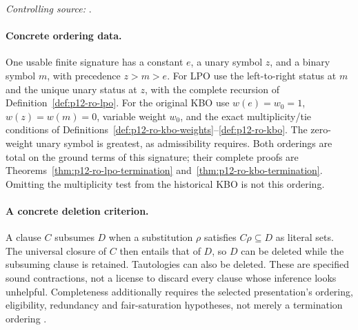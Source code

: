 \noindent\emph{Controlling source:} \cite{BachmairGanzinger2001,NieuwenhuisRubio2001}.

\paragraph{Concrete ordering data.}
One usable finite signature has a constant $e$, a unary symbol $z$, and
a binary symbol $m$, with precedence $z>m>e$.  For LPO use the
left-to-right status at $m$ and the unique unary status at $z$,
with the complete recursion of Definition~\ref{def:p12-ro-lpo}.
For the original KBO use $w(e)=w_0=1$, $w(z)=w(m)=0$, variable
weight $w_0$, and the exact multiplicity/tie conditions of
Definitions~\ref{def:p12-ro-kbo-weights}--\ref{def:p12-ro-kbo}.
The zero-weight unary symbol is greatest, as admissibility requires.
Both orderings are total on the ground terms of this signature; their
complete proofs are Theorems~\ref{thm:p12-ro-lpo-termination}
and~\ref{thm:p12-ro-kbo-termination}.  Omitting the multiplicity test
from the historical KBO is not this ordering.

\paragraph{A concrete deletion criterion.}
A clause $C$ subsumes $D$ when a substitution $\rho$ satisfies
$C\rho\subseteq D$ as literal sets.  The universal closure of $C$
then entails that of $D$, so $D$ can be deleted while the subsuming
clause is retained.  Tautologies can also be deleted.  These are specified
sound contractions, not a license to discard every clause whose inference
looks unhelpful.  Completeness additionally requires the selected
presentation's ordering, eligibility, redundancy and fair-saturation
hypotheses, not merely a termination ordering
\cite{BachmairGanzinger2001,NieuwenhuisRubio2001}.
